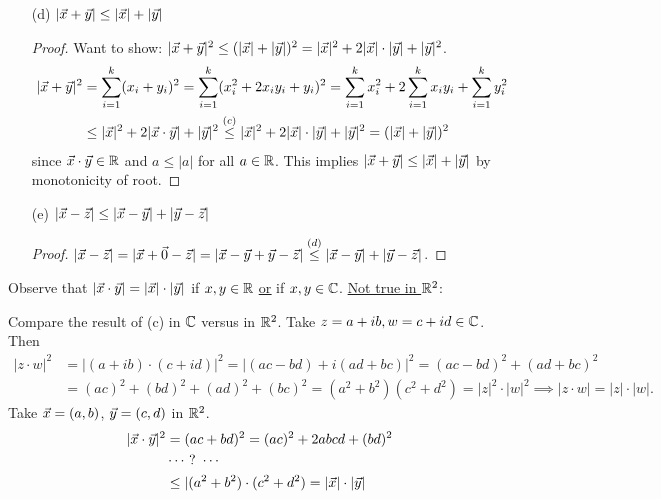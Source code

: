 \documentclass[]{article}
\begin{document}
\begin{theorem}
\begin{enumerate}
\begin{proof}
\begin{align*}
			\end{align*}
			By monotonicity of root $|\vx\cdot \vy| \leq |\vx||\vy|$.
		\end{proof}
		\item[(d)] $|\vec{x}+\vec{y}| \leq |\vec{x}|+|\vec{y}|$
		\begin{proof}
			Want to show: $|\vec{x} + \vec{y}|^2 \leq (|\vec{x}| + |\vec{y}|)^2 = |\vec{x}|^2 + 2|\vec{x}|\cdot|\vec{y}| + |\vec{y}|^2$.
			\begin{align*}
				|\vec{x} + \vec{y}|^2 &= \sum_{i=1}^k (x_i+y_i)^2 = \sum_{i=1}^k (x_i^2 + 2x_i y_i + y_i)^2
				= \sum_{i=1}^k x_i^2 + 2 \sum_{i=1}^k x_i y_i + \sum_{i=1}^k y_i^2 \\
				&\leq |\vec{x}|^2 + 2|\vec{x} \cdot \vec{y}| + |\vec{y}|^2 \overset{(c)}{\leq} |\vec{x}|^2 + 2|\vec{x}|\cdot |\vec{y}| + |\vec{y}|^2 = (|\vec{x}| + |\vec{y}|)^2
			\end{align*}
			since $\vec{x}\cdot\vec{y}\in\mathbb{R}$ and $a\leq |a|$ for all $a\in\mathbb{R}$. This implies $|\vec{x} + \vec{y}| \leq |\vec{x}| + |\vec{y}|$ by monotonicity of root.
		\end{proof}
		\item[(e)] $|\vec{x} - \vec{z}| \leq |\vec{x} - \vec{y}| + |\vec{y}-\vec{z}|$
		\begin{proof}
			$|\vec{x} - \vec{z}| = |\vec{x} + \vec{0} - \vec{z}| = |\vec{x} - \vec{y} + \vec{y} - \vec{z}| \overset{(d)}{\leq} |\vec{x}-\vec{y}| + |\vec{y}-\vec{z}|$.
		\end{proof}
	\end{enumerate}
\end{theorem}
\begin{observe}
	Observe that $|\vec{x}\cdot \vec{y}| = |\vec{x}|\cdot |\vec{y}|$ if $x,y\in\mathbb{R}$ \ul{\ul{or}} if $x,y\in\mathbb{C}$. \ul{Not true in $\mathbb{R}^2$}:
	
	Compare the result of (c) in $\mathbb{C}$ versus in $\mathbb{R}^2$.
	Take $z = a + ib,w = c+id\in\mathbb{C}$. Then
	\begin{align*}
		|z\cdot w|^2 &= |(a+ib)\cdot(c+id)|^2 = |(ac-bd) + i(ad+bc)|^2 = (ac-bd)^2 + (ad+bc)^2 \\
		&= (ac)^2 + (bd)^2 + (ad)^2 + (bc)^2 = (a^2 + b^2)(c^2+d^2) = |z|^2 \cdot |w|^2 \implies |z\cdot w| = |z|\cdot |w|.
	\end{align*}
	Take $\vec{x} = (a,b)$, $\vec{y} = (c,d)$ in $\mathbb{R}^2$.
	\begin{align*}
		|\vec{x}\cdot \vec{y}|^2 &= (ac+bd)^2 = (ac)^2 + 2abcd + (bd)^2 \\
		&\cdots\ ?\ \cdots\\
		&\leq |(a^2+b^2) \cdot (c^2+d^2) = |\vec{x}|\cdot |\vec{y}|
	\end{align*}
\end{observe}
\end{document}
